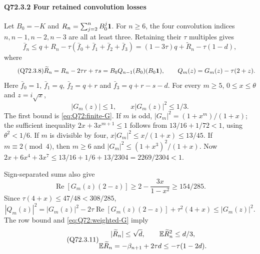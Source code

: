 \paragraph{Q72.3.2 Four retained convolution losses}\label{part:Q72.3.2}
Let $B_0=\allowbreak -K$ and $R_n=\allowbreak \sum_{j=\allowbreak 2}^nB_0^j\mathbf1$. For $n\ge\allowbreak 6$, the
four convolution indices $n,\allowbreak n-1,\allowbreak n-2,\allowbreak n-3$ are all at least three. Retaining
their $\tau$ multiples gives
\begin{equation}\tag{Q72.3.7}\label{eq:Q72:four-losses}
 \bar f_n\le q+R_n-\tau(\bar f_0+\bar f_1+\bar f_2+\bar f_3)
 =(1-3\tau)q+\widetilde R_n-\tau(1-d),
\end{equation}
where
\begin{equation}\tag{Q72.3.8}\label{eq:Q72:remainder}
 \widetilde R_n=R_n-2\tau r+\tau s
 =B_0Q_{n-1}(B_0)(B_0\mathbf1),\qquad
 Q_m(z)=G_m(z)-\tau(2+z).
\end{equation}
Here $\bar f_0=\allowbreak 1$, $\bar f_1=\allowbreak q$, $\bar f_2=\allowbreak q+r$ and
$\bar f_3=\allowbreak q+r-s-d$. For every $m\ge\allowbreak 5$, $0\le\allowbreak  x\le\allowbreak \theta$ and
$z=\allowbreak i\sqrt x$,
\begin{equation}\tag{Q72.3.9}\label{eq:Q72:weighted-G}
 |G_m(z)|\le1,\qquad x|G_m(z)|^2\le1/3.
\end{equation}
The first bound is \eqref{eq:Q72:finite-G}. If $m$ is odd,
$|G_m|^2=\allowbreak (1+x^m)/(1+x)$; the sufficient inequality
$2x+3x^{m+1}\le\allowbreak 1$ follows from
$13/16+1/72<\allowbreak 1$, using $\theta^2<\allowbreak 1/6$.
If $m$ is divisible by four, $x|G_m|^2\le\allowbreak  x/(1+x)\le\allowbreak 13/45$.
If $m\equiv2\pmod4$, then $m\ge\allowbreak 6$ and
$|G_m|^2\le\allowbreak (1+x^3)^2/(1+x)$. Now
$2x+6x^4+3x^7\le\allowbreak 13/16+1/6+13/2304=\allowbreak 2269/2304<\allowbreak 1$.

Sign-separated sums also give
\[
 \operatorname{Re}[G_m(z)(2-z)]\ge2-\frac{3x}{1-x^2}\ge154/285.
\]
Since $\tau(4+x)\le\allowbreak 47/48<\allowbreak 308/285$,
\begin{equation}\tag{Q72.3.10}\label{eq:Q72:Q-loss}
 |Q_m(z)|^2=|G_m(z)|^2-2\tau\operatorname{Re}[G_m(z)(2-z)]
                  +\tau^2(4+x)\le|G_m(z)|^2.
\end{equation}
The row bound and \eqref{eq:Q72:weighted-G} imply
\begin{equation}\tag{Q72.3.11}\label{eq:Q72:remainder-data}
 \begin{gathered}
 |\widetilde R_n|\le\sqrt d,\qquad \mathbb E\widetilde R_n^2\le d/3,\\
 \mathbb E\widetilde R_n=-\beta_{n+1}+2\tau d\le-\tau(1-2d).
 \end{gathered}
\end{equation}

